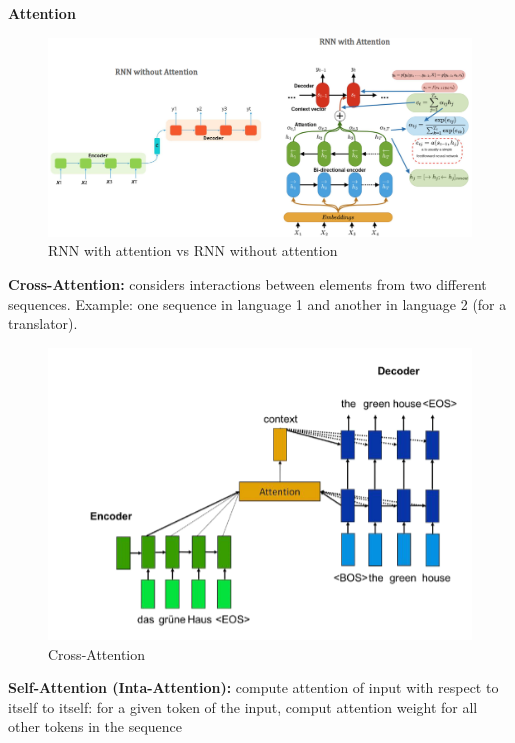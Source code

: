 \textbf{Attention}

\begin{figure}[h!t]
    \centering
    \includegraphics[width=1\linewidth]{rnnwithattention.png}
    \caption{RNN with attention vs RNN without attention}
    \label{fig:enter-label}
\end{figure}

\newpage

\begin{definition}
    \textbf{Cross-Attention:} considers interactions between elements from two different sequences. Example: one sequence in language 1 and another in language 2 (for a translator).
\end{definition}

\begin{figure}[h!t]
    \centering
    \includegraphics[width=0.7\linewidth]{crossattention.png}
    \caption{Cross-Attention}
    \label{fig:enter-label}
\end{figure}

\begin{definition}
    \textbf{Self-Attention (Inta-Attention):} compute attention of input with respect to itself to itself: for a given token of the input, comput attention weight for all other tokens in the sequence
\end{definition}

